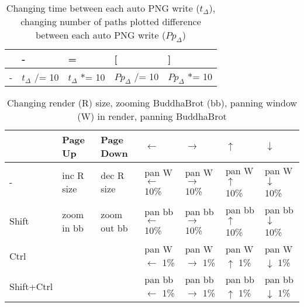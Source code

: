 \documentclass[10pt,a4paper]{article}
\begin{document}
\begin{table}[h!]
    \caption{Changing time between each auto PNG write ($t_\Delta$), changing number of paths plotted difference between each auto PNG write ($Pp_\Delta$)}
    \setlength{\tabcolsep}{0.0pt}
    \begin{tabularx}{\linewidth}{LLLLL}
        \toprule
                   & -                  & =                  & [                   & ]                   \\
        \midrule
        -          & $t_\Delta$ $/$= 10 & $t_\Delta$ $*$= 10 & $Pp_\Delta$ $/$= 10 & $Pp_\Delta$ $*$= 10 \\
        \bottomrule
    \end{tabularx}
\end{table}

\begin{table}[h!]
    \caption{Changing render (R) size, zooming BuddhaBrot (bb), panning window (W) in render, panning BuddhaBrot}
    \setlength{\tabcolsep}{0.0pt}
    \begin{tabularx}{\linewidth}{LLLLLLL}
        \toprule
                   & Page Up    & Page Down   & $\leftarrow$             & $\rightarrow$              & $\uparrow$             & $\downarrow$             \\
        \midrule
        -          & inc R size & dec R size  & pan W $\leftarrow$ 10\%  & pan W  $\rightarrow$ 10\%  & pan W $\uparrow$ 10\%  & pan W $\downarrow$ 10\%  \\
        Shift      & zoom in bb & zoom out bb & pan bb $\leftarrow$ 10\% & pan bb  $\rightarrow$ 10\% & pan bb $\uparrow$ 10\% & pan bb $\downarrow$ 10\% \\
        Ctrl       &            &             & pan W $\leftarrow$ 1\%   & pan W  $\rightarrow$ 1\%   & pan W $\uparrow$ 1\%   & pan W $\downarrow$ 1\%   \\
        Shift+Ctrl &            &             & pan bb $\leftarrow$ 1\%  & pan bb  $\rightarrow$ 1\%  & pan bb $\uparrow$ 1\%  & pan bb $\downarrow$ 1\%  \\
        \bottomrule
    \end{tabularx}
\end{table}
\end{document}
